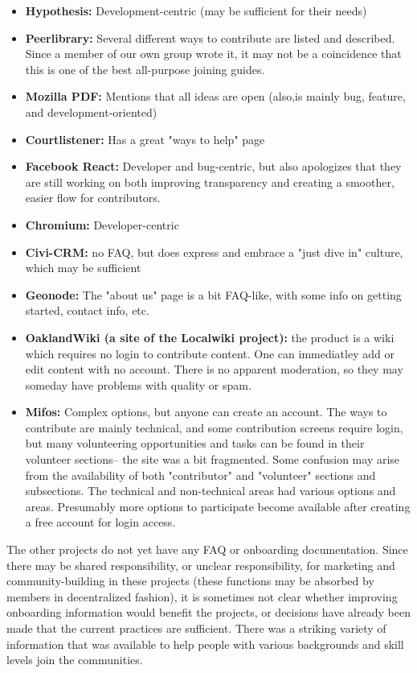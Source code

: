 \begin{itemize}
\item {\bf Hypothesis:} Development-centric (may be sufficient for their needs)
\item {\bf Peerlibrary:} Several different ways to contribute are listed and described. Since a member of our own group wrote it, it may not be a coincidence that this is one of the best all-purpose joining guides.
\item {\bf Mozilla PDF:} Mentions that all ideas are open (also,is mainly bug, feature, and development-oriented)
\item {\bf Courtlistener:} Has a great "ways to help" page 
\item {\bf Facebook React:} Developer and bug-centric, but also apologizes that they are still working on both improving transparency and creating a smoother, easier flow for contributors.
\item {\bf Chromium:} Developer-centric
\item {\bf Civi-CRM:} no FAQ, but does express and embrace a "just dive in" culture, which may be sufficient
\item {\bf Geonode:} The "about us" page is a bit FAQ-like, with some info on getting started, contact info, etc.
\item {\bf OaklandWiki (a site of the Localwiki project):} the product is a wiki which requires no login to contribute content. One can immediatley add or edit content with no account. There is no apparent moderation, so they may someday have problems with quality or spam.
\item {\bf Mifos: } Complex options, but anyone can create an account. The ways to contribute are mainly technical, and some contribution screens require login, but many volunteering opportunities and tasks can be found in their volunteer sections-- the site was a bit fragmented. Some confusion may arise from the availability of both "contributor" and "volunteer" sections and subsections. The technical and non-technical areas had various options and areas. Presumably more options to participate become available after creating a free account for login access.
\end{itemize}

The other projects do not yet have any FAQ or onboarding documentation. Since there may be shared responsibility, or unclear responsibility, for marketing and community-building in these projects (these functions may be absorbed by members in decentralized fashion), it is sometimes not clear whether improving onboarding information would benefit the projects, or decisions have already been made that the current practices are sufficient. There was a striking variety of information that was available to help people with various backgrounds and skill levels join the communities. 




